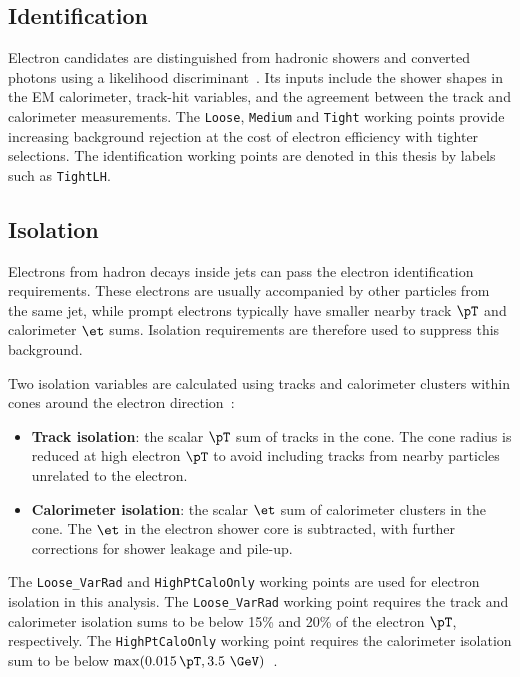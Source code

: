 \subsection{Identification}

Electron candidates are distinguished from hadronic showers and converted photons using a likelihood discriminant~\cite{ATLAS2019ElectronReco}.
Its inputs include the shower shapes in the EM calorimeter, track-hit variables, and the agreement between the track and calorimeter measurements.
The \texttt{Loose}, \texttt{Medium} and \texttt{Tight} working points provide increasing background rejection at the cost of electron efficiency with tighter selections.
The identification working points are denoted in this thesis by labels such as \texttt{TightLH}.

\subsection{Isolation}

Electrons from hadron decays inside jets can pass the electron identification requirements.
These electrons are usually accompanied by other particles from the same jet, while prompt electrons typically have smaller nearby track $\pT$ and calorimeter $\et$ sums.
Isolation requirements are therefore used to suppress this background.

Two isolation variables are calculated using tracks and calorimeter clusters within cones around the electron direction~\cite{ATLAS2019ElectronPerformance}:
\begin{itemize}
    \item \textbf{Track isolation}: the scalar $\pT$ sum of tracks in the cone. The cone radius is reduced at high electron $\pT$ to avoid including tracks from nearby particles unrelated to the electron.
    \item \textbf{Calorimeter isolation}: the scalar $\et$ sum of calorimeter clusters in the cone. The $\et$ in the electron shower core is subtracted, with further corrections for shower leakage and pile-up.
\end{itemize}
The \texttt{Loose\_VarRad} and \texttt{HighPtCaloOnly} working points are used for electron isolation in this analysis.
The \texttt{Loose\_VarRad} working point requires the track and calorimeter isolation sums to be below 15\% and 20\% of the electron $\pT$, respectively.
The \texttt{HighPtCaloOnly} working point requires the calorimeter isolation sum to be below $\max(0.015\,\pT,3.5~\GeV)$~\cite{ATLAS2019ElectronPerformance}.

